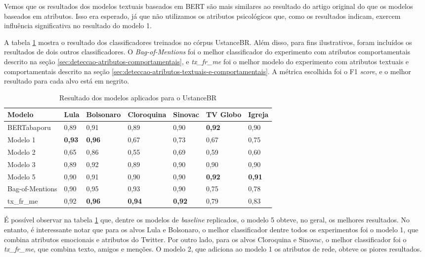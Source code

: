 \documentclass[
	12pt, oneside, a4paper, english, brazil
]{abntex2ppgsi}
\begin{document}
Vemos que os resultados dos modelos textuais baseados em BERT são mais similares ao resultado do artigo original do que os modelos baseados em atributos. Isso era esperado, já que não utilizamos os atributos psicológicos que, como os resultados indicam, exercem influência significativa no resultado do modelo 1.

A tabela \ref{tab:resultados-ustancebr-baseline} mostra o resultado dos classificadores treinados no córpus UstanceBR. Além disso, para fins ilustrativos, foram incluídos os resultados de dois outros classificadores. O {\em Bag-of-Mentions} foi o melhor classificador do experimento com atributos comportamentais descrito na seção \ref{sec:deteccao-atributos-comportamentais}, e {\em tx\_fr\_me} foi o melhor modelo do experimento com atributos textuais e comportamentais descrito na seção \ref{sec:deteccao-atributos-textuais-e-comportamentais}. A métrica escolhida foi o F1 {\em score}, e o melhor resultado para cada alvo está em negrito.

\begin{table}[ht]
    \centering
    \caption{Resultado dos modelos aplicados para o UstanceBR}
    \label{tab:resultados-ustancebr-baseline}
    \begin{tabular}{ lllllll }
        \hline
        Modelo & Lula & Bolsonaro & Cloroquina & Sinovac & TV Globo & Igreja \\
        \hline
        BERTabaporu & 0,89 & 0,91 & 0,89 & 0,90 & \textbf{0,92} & 0,90 \\
        Modelo 1 & \textbf{0,93} & \textbf{0,96} & 0,67 & 0,73 & 0,67 & 0,75 \\
        Modelo 2 & 0,65 & 0,86 & 0,55 & 0,69 & 0,59 & 0,60 \\
        Modelo 3 & 0,89 & 0,92 & 0,89 & 0,90 & 0,90 & 0,90 \\
        Modelo 5 & 0,90 & 0,91 & 0,90 & 0,90 & \textbf{0,92} & \textbf{0,91} \\
        Bag-of-Mentions & 0,90 & 0,95 & 0,93 & 0,90 & 0,75 & 0,78 \\
        tx\_fr\_me & 0,92 & \textbf{0,96} & \textbf{0,94} & \textbf{0,92} & 0,79 & 0,83 \\
        \hline
    \end{tabular}
\end{table}

É possível observar na tabela \ref{tab:resultados-ustancebr-baseline} que, dentre os modelos de {\em baseline} replicados, o modelo 5 obteve, no geral, os melhores resultados. No entanto, é interessante notar que para os alvos Lula e Bolsonaro, o melhor classificador dentre todos os experimentos foi o modelo 1, que combina atributos emocionais e atributos do Twitter. Por outro lado, para os alvos Cloroquina e Sinovac, o melhor classificador foi o {\em tx\_fr\_me}, que combina texto, amigos e menções. O modelo 2, que adiciona ao modelo 1 os atributos de rede, obteve os piores resultados.
\end{document}
